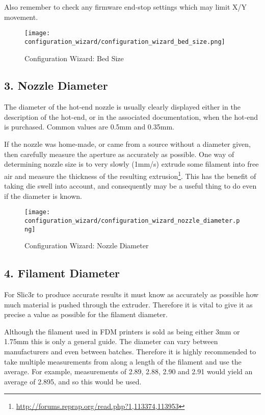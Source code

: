 Also remember to check any firmware end-stop settings which may limit X/Y movement.

\begin{figure}[H]
\centering
\texttt{[image: configuration\_wizard/configuration\_wizard\_bed\_size.png]}
\caption{Configuration Wizard: Bed Size}
\label{fig:configuration_wizard_bed_size}
\end{figure}

\newpage
\subsection{3. Nozzle Diameter}
\label{sub:3_nozzle_diameter}
The diameter of the hot-end nozzle is usually clearly displayed either in the description of the hot-end, or in the associated documentation, when the hot-end is purchased.  Common values are 0.5mm and 0.35mm.  

If the nozzle was home-made, or came from a source without a diameter given, then carefully measure the aperture as accurately as possible.  One way of determining nozzle size is to very slowly (1mm/s) extrude some filament into free air and measure the thickness of the resulting extrusion\footnote{\url{http://forums.reprap.org/read.php?1,113374,113953}}.  This has the benefit of taking die swell into account, and consequently may be a useful thing to do even if the diameter is known.

\begin{figure}[H]
\centering
\texttt{[image: configuration\_wizard/configuration\_wizard\_nozzle\_diameter.png]}
\caption{Configuration Wizard: Nozzle Diameter}
\label{fig:configuration_wizard_nozzle_diameter}
\end{figure}

\newpage
\subsection{4. Filament Diameter}
\label{sub:4_filament_diameter}
For Slic3r to produce accurate results it must know as accurately as possible how much material is pushed through the extruder.  Therefore it is vital to give it as precise a value as possible for the filament diameter.  

Although the filament used in FDM printers is sold as being either 3mm or 1.75mm this is only a general guide.  The diameter can vary between manufacturers and even between batches.  Therefore it is highly recommended to take multiple measurements from along a length of the filament and use the average.  For example, measurements of 2.89, 2.88, 2.90 and 2.91 would yield an average of 2.895, and so this would be used.

